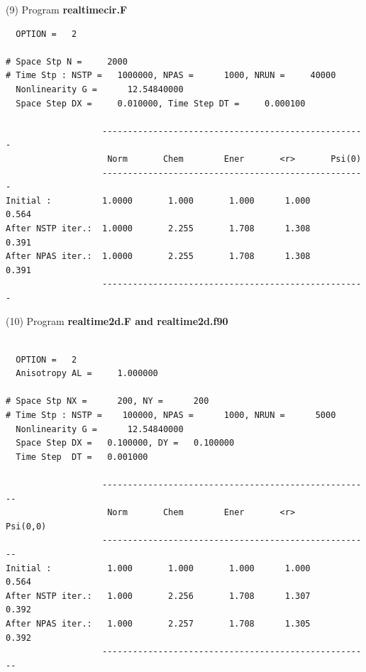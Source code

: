 \documentclass[onecolumn]{elsart3p}
\begin{document}
(9)  Program {\bf realtimecir.F}
\begin{verbatim}
  OPTION =   2

# Space Stp N =     2000
# Time Stp : NSTP =   1000000, NPAS =      1000, NRUN =     40000
  Nonlinearity G =      12.54840000
  Space Step DX =     0.010000, Time Step DT =     0.000100

                   ----------------------------------------------------
                    Norm       Chem        Ener       <r>       Psi(0)
                   ----------------------------------------------------
Initial :          1.0000       1.000       1.000      1.000      0.564
After NSTP iter.:  1.0000       2.255       1.708      1.308      0.391
After NPAS iter.:  1.0000       2.255       1.708      1.308      0.391
                   ----------------------------------------------------
\end{verbatim}



(10)  Program {\bf realtime2d.F and realtime2d.f90}
\begin{verbatim}

  OPTION =   2
  Anisotropy AL =     1.000000

# Space Stp NX =      200, NY =      200
# Time Stp : NSTP =    100000, NPAS =      1000, NRUN =      5000
  Nonlinearity G =      12.54840000
  Space Step DX =   0.100000, DY =   0.100000
  Time Step  DT =   0.001000

                   -----------------------------------------------------
                    Norm       Chem        Ener       <r>       Psi(0,0)
                   -----------------------------------------------------
Initial :           1.000       1.000       1.000      1.000      0.564
After NSTP iter.:   1.000       2.256       1.708      1.307      0.392
After NPAS iter.:   1.000       2.257       1.708      1.305      0.392
                   -----------------------------------------------------





\end{verbatim}
\end{document}
